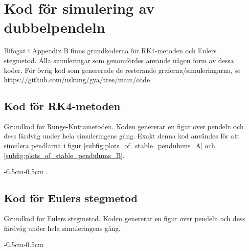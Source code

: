 \newpage

\section{Kod för simulering av dubbelpendeln} \label{appendix:code}
Bifogat i Appendix B finns grundkoderna för RK4-metoden och Eulers stegmetod. Alla simuleringar som genomfördes använde någon form av dessa koder. För övrig kod som genererade de resterande graferna/simuleringarna, se  \url{https://github.com/uskung/gya/tree/main/code}.

    \subsection*{Kod för RK4-metoden}
    Grundkod för Runge-Kuttametoden. Koden genererar en figur över pendeln och dess färdväg under hela simuleringens gång. Exakt denna kod användes för att simulera pendlarna i figur \ref{subfig:plots_of_stable_pendulums_A} och \ref{subfig:plots_of_stable_pendulums_B}.
    \vspace{0.5cm}
    \begin{adjustwidth}{-0.5cm}{-0.5cm}
        . 
    \end{adjustwidth}
    \newpage
    \subsection*{Kod för Eulers stegmetod}
    Grundkod för Eulers stegmetod. Koden genererar en figur över pendeln och dess färdväg under hela simuleringens gång.
    \vspace{0.5cm}
    \begin{adjustwidth}{-0.5cm}{-0.5cm}
        
    \end{adjustwidth}